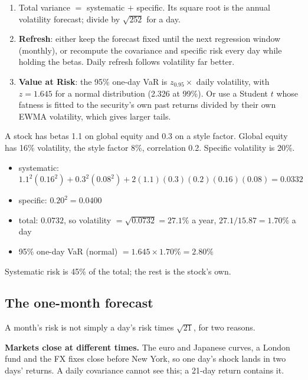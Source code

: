 \documentclass[11pt,a4paper]{article}
\newcommand{\ann}{\sqrt{252}}
\begin{document}
\begin{method}
\begin{enumerate}[leftmargin=1.4em]
  \item Total variance $=$ systematic $+$ specific. Its square root is the annual volatility forecast; divide by $\ann$ for a day.
  \item \textbf{Refresh}: either keep the forecast fixed until the next regression window (monthly), or recompute the covariance and specific risk every day while holding the betas. Daily refresh follows volatility far better.
  \item \textbf{Value at Risk}: the 95\% one-day VaR is $z_{0.95}\times$ daily volatility, with $z = 1.645$ for a normal distribution (2.326 at 99\%). Or use a Student $t$ whose fatness is fitted to the security's own past returns divided by their own EWMA volatility, which gives larger tails.
\end{enumerate}
\end{method}

\begin{example}
A stock has betas 1.1 on global equity and 0.3 on a style factor. Global equity has
16\% volatility, the style factor 8\%, correlation 0.2. Specific volatility is 20\%.
\begin{itemize}[leftmargin=1.2em]
  \item systematic: $1.1^2(0.16^2) + 0.3^2(0.08^2) + 2(1.1)(0.3)(0.2)(0.16)(0.08) = 0.0332$
  \item specific: $0.20^2 = 0.0400$
  \item total: $0.0732$, so volatility $=\sqrt{0.0732} = 27.1\%$ a year, $27.1/15.87 = 1.70\%$ a day
  \item 95\% one-day VaR (normal) $= 1.645\times1.70\% = 2.80\%$
\end{itemize}
Systematic risk is 45\% of the total; the rest is the stock's own.
\end{example}

\subsection{The one-month forecast}

A month's risk is not simply a day's risk times $\sqrt{21}$, for two reasons.

\textbf{Markets close at different times.} The euro and Japanese curves, a London
fund and the FX fixes close before New York, so one day's shock lands in two days'
returns. A daily covariance cannot see this; a 21-day return contains it.
\end{document}

